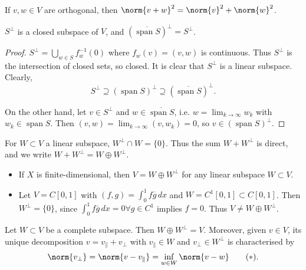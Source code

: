 \documentclass{article}
\DeclareMathOperator{\spn}{span}
\begin{document}
\begin{fact}
    If $v, w \in V$ are orthogonal, then $\norm{v+w}^2 = \norm{v}^2 + \norm{w}^2$.
\end{fact}

\begin{fact}
    $S^\perp$ is a closed subspace of $V$, and $(\overline{\spn S})^\perp = S^\perp$.
\end{fact}

\begin{proof}
    $S^\perp = \bigcup_{w \in S} f_w^{-1}(0)$ where $f_w(v) = (v, w)$ is continuous.
    Thus $S^\perp$ is the intersection of closed sets, so closed. It is clear that $S^\perp$ is a linear subspace.
    Clearly,
    \begin{equation*}
        S^\perp \supseteq (\spn S)^\perp \supseteq (\overline{\spn S})^\perp.
    \end{equation*}

    On the other hand, let $v \in S^\perp$ and $w \in \overline{\spn S}$, i.e. $w = \lim_{k \to \infty} w_k$ with $w_k \in \spn S$.
    Then $(v, w) = \lim_{k \to \infty} (v, w_k) = 0$, so $v \in (\spn S)^\perp$.
\end{proof}

For $W \subset V$ a linear subspace, $W^\perp \cap W = \{0\}$. Thus the sum $W + W^\perp$ is direct, and we write $W + W^\perp = W \oplus W^\perp$.

\begin{eg}
    \leavevmode
    \begin{itemize}
        \item If $X$ is finite-dimensional, then $V = W \oplus W^\perp$ for any linear subspace $W \subset V$.
        \item Let $V = C[0,1]$ with $(f,g) = \int_0^1 f \overline{g} \, dx$ and $W = C^1[0,1] \subset C[0,1]$.
            Then $W^\perp = \{0\}$, since $\int_0^1 f \overline{g} \, dx = 0 \forall g \in C^1$ implies $f = 0$. Thus $V \neq W \oplus W^\perp$.
    \end{itemize}
\end{eg}

\begin{thm}
    Let $W \subset V$ be a complete subspace. Then $W \oplus W^\perp = V$.
    Moreover, given $v \in V$, its unique decomposition $v = v_\parallel + v_\perp$ with $v_\parallel \in W$ and $v_\perp \in W^\perp$ is characterised by
    \begin{equation*}
        \norm{v_\perp} = \norm{v - v_\parallel} = \inf_{w \in W} \norm{v - w} \tag{$*$} \label{eq:17star}.
    \end{equation*}
\end{thm}
\end{document}
